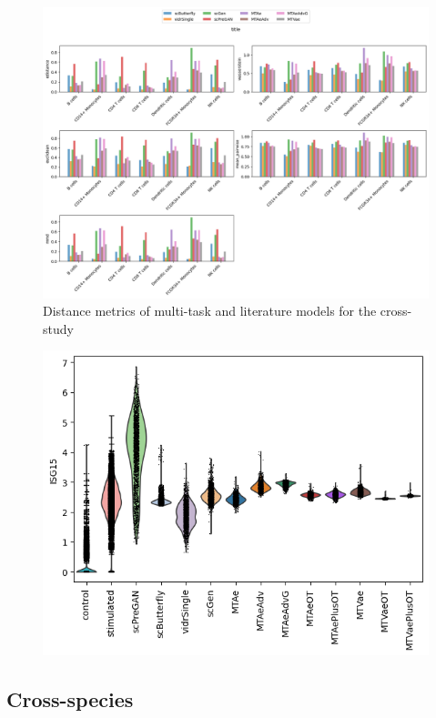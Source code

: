 \documentclass[12pt, a4paper]{article}
\begin{document}
\begin{figure}[h!]
    \centering
    \includegraphics[width=.85\textwidth]{selected_benchmarking_cell_type_distance_metrics_cross_study.png}
    \caption{Distance metrics of multi-task and literature models for the cross-study}
    \label{}
\end{figure}

\begin{figure}[h!]
    \centering
    \includegraphics[width=.85\textwidth]{violins_cross_study.png}
    \caption{}
    \label{}
\end{figure}

\clearpage

\subsection{Cross-species}
\end{document}
